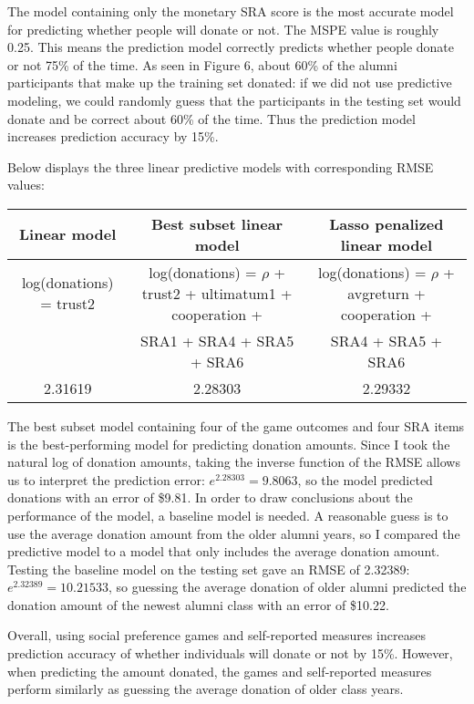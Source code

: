 \documentclass[12pt]{article}
\begin{document}
The model containing only the monetary SRA score is the most accurate model for predicting whether people will donate or not. The MSPE value is roughly 0.25. This means the prediction model correctly predicts whether people donate or not 75\% of the time. As seen in Figure 6, about 60\% of the alumni participants that make up the training set donated: if we did not use predictive modeling, we could randomly guess that the participants in the testing set would donate and be correct about 60\% of the time. Thus the prediction model increases prediction accuracy by 15\%.
 
Below displays the three linear predictive models with corresponding RMSE values:
 
\begin{center}
\begin{adjustbox}{width=\textwidth}
\begin{tabular}{ c | c | c }
\hline \hline
Linear model & Best subset linear model & Lasso penalized linear model \\
\hline
log(donations) = trust2 & log(donations) = \(\rho\) + trust2 + ultimatum1 + cooperation + & log(donations) = \(\rho\) + avgreturn + cooperation + \\
\small & SRA1 + SRA4 + SRA5 + SRA6 & SRA4 + SRA5 + SRA6 \\
\hline
2.31619 & 2.28303 & 2.29332 \\
\hline \hline
\end{tabular}
\end{adjustbox}
\end{center}

The best subset model containing four of the game outcomes and four SRA items is the best-performing model for predicting donation amounts. Since I took the natural log of donation amounts, taking the inverse function of the RMSE allows us to interpret the prediction error: \(e^{2.28303} = 9.8063\), so the model predicted donations with an error of \$9.81. In order to draw conclusions about the performance of the model, a baseline model is needed. A reasonable guess is to use the average donation amount from the older alumni years, so I compared the predictive model to a model that only includes the average donation amount. Testing the baseline model on the testing set gave an RMSE of 2.32389: \(e^{2.32389} = 10.21533\), so guessing the average donation of older alumni predicted the donation amount of the newest alumni class with an error of \$10.22. 

Overall, using social preference games and self-reported measures increases prediction accuracy of whether individuals will donate or not by 15\%. However, when predicting the amount donated, the games and self-reported measures perform similarly as guessing the average donation of older class years.
\end{document}
